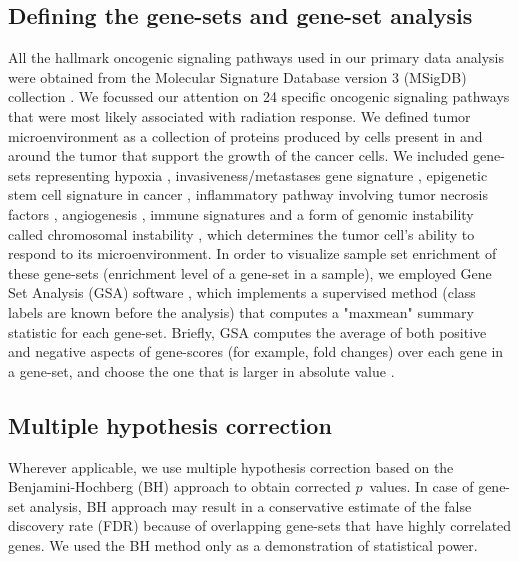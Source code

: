 \documentclass[hidelinks,11pt]{article}
\begin{document}
\subsection*{Defining the gene-sets and gene-set analysis}

All the hallmark oncogenic signaling pathways used in our primary data analysis were obtained from the Molecular Signature Database version 3 (MSigDB) collection \cite{msigdb_hm}. We focussed our attention on 24 specific oncogenic signaling pathways that were most likely associated with radiation response. We defined tumor microenvironment as a collection of proteins produced by cells present in and around the tumor that support the growth of the cancer cells. We included gene-sets representing hypoxia \cite{hypoxia}, invasiveness/metastases gene signature \cite{IGS}, epigenetic stem cell signature in cancer \cite{epigen}, inflammatory pathway involving tumor necrosis factors \cite{TNF}, angiogenesis \cite{WH}, immune signatures \cite{immune} and a form of genomic instability called chromosomal instability \cite{CIN}, which determines the tumor cell's ability to respond to its microenvironment. In order to visualize sample set enrichment of these gene-sets (enrichment level of a gene-set in a sample), we employed Gene Set Analysis (GSA) software \cite{gsa_software}, which implements a supervised method (class labels are known before the analysis) that computes a "maxmean" summary statistic for each gene-set. Briefly, GSA computes the average of both positive and negative aspects of gene-scores (for example, fold changes) over each gene in a gene-set, and choose the one that is larger in absolute value \cite{gsa}. %

\subsection*{Multiple hypothesis correction}

Wherever applicable, we use multiple hypothesis correction based on the Benjamini-Hochberg (BH) approach \cite{BH} to obtain corrected $p$~values. In case of gene-set analysis, BH approach may result in a conservative estimate of the false discovery rate (FDR) because of overlapping gene-sets that have highly correlated genes. We used the BH method only as a demonstration of statistical power. 

\end{document}
